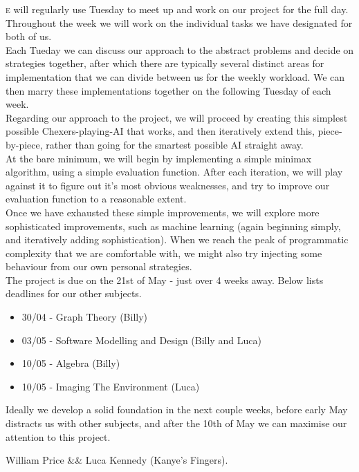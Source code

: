 \documentclass{article}[11pt]
\begin{document}
\lettrine[lines=2]{}e will regularly use Tuesday to meet up and work on our project for the full day. Throughout the week we will work on the individual tasks we have designated for both of us.\\

Each Tueday we can discuss our approach to the abstract problems and decide on strategies together, after which there are typically several distinct areas for implementation that we can divide between us for the weekly workload. We can then marry these implementations together on the following Tuesday of each week.\\

Regarding our approach to the project, we will proceed by creating this simplest possible Chexers-playing-AI that works, and then iteratively extend this, piece-by-piece, rather than going for the smartest possible AI straight away.\\

At the bare minimum, we will begin by implementing a simple minimax algorithm, using a simple evaluation function. After each iteration, we will play against it to figure out it's most obvious weaknesses, and try to improve our evaluation function to a reasonable extent.\\

Once we have exhausted these simple improvements, we will explore more sophisticated improvements, such as machine learning (again beginning simply, and iteratively adding sophistication). When we reach the peak of programmatic complexity that we are comfortable with, we might also try injecting some behaviour from our own personal strategies.\\

The project is due on the 21st of May - just over 4 weeks away. Below lists deadlines for our other subjects.
\begin{itemize}
    \item 30/04 - Graph Theory (Billy)
    \item 03/05 - Software Modelling and Design (Billy and Luca)
    \item 10/05 - Algebra (Billy)
    \item 10/05 - Imaging The Environment (Luca)
\end{itemize}

Ideally we develop a solid foundation in the next couple weeks, before early May distracts us with other subjects, and after the 10th of May we can maximise our attention to this project.

\null\hfill William Price \&\& Luca Kennedy (Kanye's Fingers).
\end{document}

